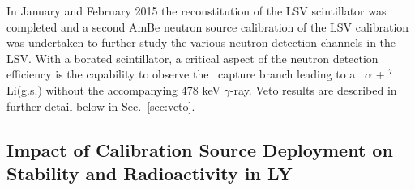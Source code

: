 In January and February 2015 the reconstitution of the LSV scintillator was completed and a second AmBe neutron source calibration of the LSV calibration was undertaken to further study the various
neutron detection channels in the LSV. With a borated scintillator, a critical aspect of the neutron detection efficiency is the capability to observe the \brbortenground\
capture branch leading to a \enbortengroundalpha\ $\alpha$ + $^7$Li(g.s.) without the accompanying 478 keV $\gamma$-ray. Veto results are described in further detail below in Sec.~\ref{sec:veto}.



\subsection{Impact of Calibration Source Deployment on Stability and Radioactivity in LY}